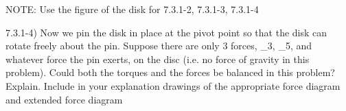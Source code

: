 \label{fnt7.3.1-4}

NOTE: Use the figure of the disk for \FNTs{} 7.3.1-2, 7.3.1-3, 7.3.1-4

7.3.1-4) Now we pin the disk in place at the pivot point so that the disk can rotate freely about the pin.  Suppose there are only 3 forces, _3, _5, and whatever force the pin exerts, on the disc (i.e. no force of gravity in this problem).  Could both the torques and the forces be balanced in this problem?  Explain.  Include in your explanation drawings of the appropriate force diagram and extended force diagram